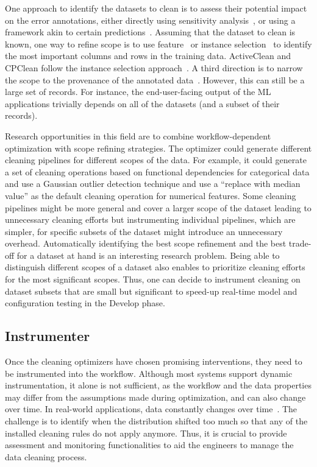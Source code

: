 \documentclass[11pt,dvipsnames]{article}
\begin{document}
One approach to identify the datasets to clean is to assess their potential impact on the error annotations, either directly using sensitivity analysis~\cite{ComplaintDrivenTrainingDataDebugging}, or using a framework akin to certain predictions~\cite{CPClean}. Assuming that the dataset to clean is known, one way to refine scope is to use feature~\cite{FeatureSelection} or instance selection~\cite{InstanceSelection} to identify the most important columns and rows in the training data. ActiveClean and CPClean follow the instance selection approach~\cite{ActiveClean,CPClean}.
A third direction is to narrow the scope to the provenance of the annotated data~\cite{ComplaintDrivenTrainingDataDebugging}.  However, this can still be a large set of records.  For instance, the end-user-facing output of the ML applications trivially depends on all of the datasets (and a subset of their records).  

Research opportunities in this field are to combine workflow-dependent optimization with scope refining strategies. The optimizer could generate different cleaning pipelines for different scopes of the data. For example, it could generate a set of cleaning operations based on functional dependencies for categorical data and use a Gaussian outlier detection technique and use a ``replace with median value'' as the default cleaning operation for numerical features. Some cleaning pipelines might be more general and cover a larger scope of the dataset leading to unnecessary cleaning efforts but instrumenting individual pipelines, which are simpler, for specific subsets of the dataset might introduce an unnecessary overhead. Automatically identifying the best scope refinement and the best trade-off for a dataset at hand is an interesting research problem. 
Being able to distinguish different scopes of a dataset also enables to prioritize cleaning efforts for the most significant scopes. Thus, one can decide to instrument cleaning on dataset subsets that are small but significant to speed-up real-time model and configuration testing in the Develop phase. 


\subsection{Instrumenter}

Once the cleaning optimizers have chosen promising interventions, they need to be instrumented into the workflow.  Although most systems support dynamic instrumentation, it alone is not sufficient, as the workflow and the data properties may differ from the assumptions made during optimization, and can also change over time.
In real-world applications, data constantly changes over time~\cite{SergeysPaper,ContinuousDataCleaning, ValidationforDynamicDataIngestion}. The challenge is to identify when the distribution shifted too much so that any of the installed cleaning rules do not apply anymore.
Thus, it is crucial to provide assessment and monitoring functionalities to aid the engineers to manage the data cleaning process.
\end{document}
